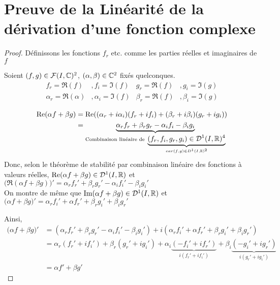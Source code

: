 \documentclass{article}
\begin{document}
\section{Preuve de la Linéarité de la dérivation d'une fonction complexe}
\begin{proof}
	
Définissons les fonctions $f_r$ etc. comme les parties réelles et imaginaires de $f$ 

Soient $(f, g) \in \mathcal{F}(I, \mathbb C)^2$, $(\alpha, \beta) \in \mathbb C^2$ fixés quelconques.
\begin{align*}
	f_r = \Re(f) &, f_i = \Im(f) &g_r = \Re(f) &, g_i = \Im(g)\\
	\alpha_r = \Re(\alpha) &, \alpha_i = \Im(f) &\beta_r = \Re(f) &, \beta_i = \Im(g)
\end{align*}

\begin{align*}
	\text{Re}( \alpha f + \beta g) &= \text{Re}((\alpha_r + i \alpha_i)(f_r + i f_i) + (\beta_r+ i\beta_i)(g_r+ i g_i)) \\
	&= \underbrace{\alpha_r f_r + \beta_r g_r - \alpha_i f_i - \beta_i g_i}_{\text{Combinaison linéaire de } \underbrace{(f_r, f_i, g_r, g_i) \in \mathcal D^1(I, \mathbb R)^4}_{car (f,g) \in D^1(I, \mathbb R)^2}}
\end{align*}
Donc, selon le théorème de stabilité par combinaison linéaire des fonctions à valeurs réelles, $\text{Re}(\alpha f + \beta g) \in \mathcal D^1(I, \mathbb R)$ et $\big(\Re(\alpha f + \beta g)\big)' = \alpha_r f_r' + \beta_r g_r' - \alpha_i f_i' - \beta_i g_i'$
\\
On montre de même que $\text{Im}(\alpha f + \beta g) \in \mathcal D^1(I, \mathbb R)$ et $\big(\alpha f + \beta g\big)' = \alpha_r f_i' +\alpha f_r' +\beta_r g_i' +\beta_i g_r'$

Ainsi,
\begin{align*}
	\big( \alpha f + \beta g \big)' &= (\alpha_r f_r' + \beta_r g_r' - \alpha_i f_i' - \beta_i g_i') + i (\alpha_r f_i' +\alpha f_r' +\beta_r g_i' +\beta_i g_r') \\
	&= \alpha_r(f_r' + if_i') + \beta_r(g_r' + ig_i') + \alpha_i \underbrace{(-f_i' + if_r')}_{i(f_r' + if_i')} + \beta_i \underbrace{( -g_i' + ig_r')}_{i(g_r' + ig_i')} \\
	&=\alpha f' + \beta g'
\end{align*}

\end{proof}
\end{document}
